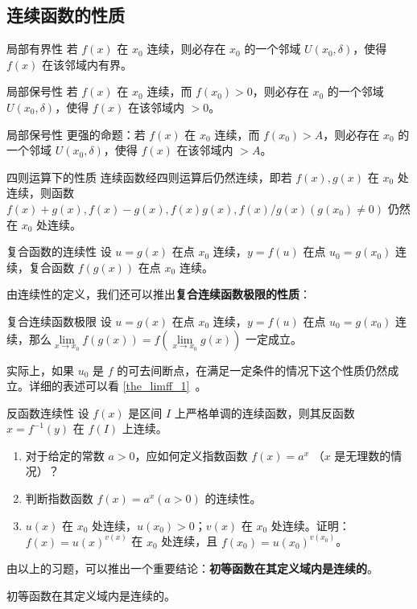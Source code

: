\subsection{连续函数的性质}
\begin{theorem}{局部有界性}
若 $f(x)$ 在 $x_0$ 连续，则必存在 $x_0$ 的一个邻域 $U(x_0,\delta)$，使得 $f(x)$ 在该邻域内有界。
\end{theorem}
\begin{theorem}{局部保号性}
若 $f(x)$ 在 $x_0$ 连续，而 $f(x_0)>0$，则必存在 $x_0$ 的一个邻域 $U(x_0,\delta)$，使得 $f(x)$ 在该邻域内 $>0$。
\end{theorem}
\begin{theorem}{局部保号性}
更强的命题：若 $f(x)$ 在 $x_0$ 连续，而 $f(x_0)>A$，则必存在 $x_0$ 的一个邻域 $U(x_0,\delta)$，使得 $f(x)$ 在该邻域内 $>A$。
\end{theorem}
\begin{theorem}{四则运算下的性质}
连续函数经四则运算后仍然连续，即若 $f(x),g(x)$ 在 $x_0$ 处连续，则函数 $f(x)+g(x),f(x)-g(x),f(x)g(x),f(x)/g(x)(g(x_0)\neq 0)$ 仍然在 $x_0$ 处连续。
\end{theorem}

\begin{theorem}{复合函数的连续性}
设 $u=g(x)$ 在点 $x_0$ 连续，$y=f(u)$ 在点 $u_0=g(x_0)$ 连续，复合函数 $f(g(x))$ 在点 $x_0$ 连续。
\end{theorem}

由连续性的定义，我们还可以推出\textbf{复合连续函数极限的性质}：
\begin{theorem}{复合连续函数极限}
设 $u=g(x)$ 在点 $x_0$ 连续，$y=f(u)$ 在点 $u_0=g(x_0)$ 连续，那么$\lim\limits_{x\rightarrow x_0}f(g(x))=f(\lim\limits_{x\rightarrow x_0}g(x))$ 一定成立。
\end{theorem}


实际上，如果 $u_0$ 是 $f$ 的可去间断点，在满足一定条件的情况下这个性质仍然成立。详细的表述可以看 \autoref{the_limff_1}~。

\begin{theorem}{反函数连续性}
设 $f(x)$ 是区间 $I$ 上严格单调的连续函数，则其反函数 $x=f^{-1}(y)$ 在 $f(I)$ 上连续。
\end{theorem}

\begin{exercise}{}
\begin{enumerate}
\item 对于给定的常数 $a>0$，应如何定义指数函数 $f(x)=a^x$ （$x$ 是无理数的情况）？
\item 判断指数函数 $f(x)=a^x(a>0)$ 的连续性。
\item $u(x)$ 在 $x_0$ 处连续，$u(x_0)>0$；$v(x)$ 在 $x_0$ 处连续。证明： $f(x)=u(x)^{v(x)}$ 在 $x_0$ 处连续，且 $f(x_0)=u(x_0)^{v(x_0)}$。
\end{enumerate}

由以上的习题，可以推出一个重要结论：\textbf{初等函数在其定义域内是连续的}。
\end{exercise}
\begin{theorem}{}
初等函数在其定义域内是连续的。
\end{theorem}
